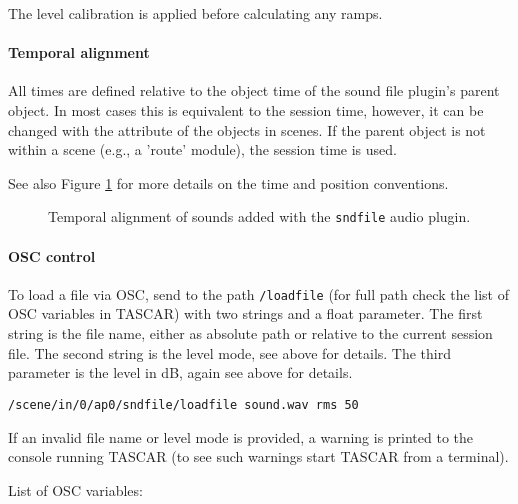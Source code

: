 The level calibration is applied before calculating any ramps.

\paragraph{Temporal alignment}
%
All times are defined relative to the object time of the sound file plugin's parent object. In most cases this is equivalent to the session time, however, it can be changed with the  attribute of the objects in scenes. If the parent object is not within a scene (e.g., a 'route' module), the session time is used.

See also Figure \ref{fig:ap_sndfile} for more details on the time and position conventions.

\begin{figure}[htb]
    \centering
    \caption{Temporal alignment of sounds added with the {\tt sndfile} audio plugin.}
    \label{fig:ap_sndfile}
\end{figure}

\paragraph{OSC control}
%
To load a file via OSC, send to the path {\tt /loadfile} (for full
path check the list of OSC variables in TASCAR) with two strings and a
float parameter.
%
The first string is the file name, either as absolute path or relative
to the current session file. The second string is the level mode, see
above for details. The third parameter is the level in dB, again see
above for details.
%
\begin{verbatim}
/scene/in/0/ap0/sndfile/loadfile sound.wav rms 50
\end{verbatim}
%
If an invalid file name or level mode is provided, a warning is
printed to the console running TASCAR (to see such warnings start
TASCAR from a terminal).

List of OSC variables:

